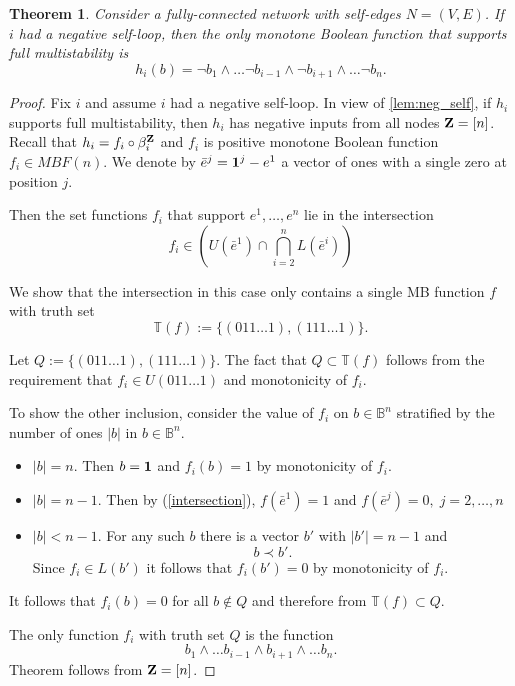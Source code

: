 \documentclass[12pt]{amsart}
\newcommand{\bZ}{{\bf Z}}
\newcommand{\bone}{{\bf 1}}
\newcommand{\bbB}{\mathbb{B}}
\newcommand{\bbT}{\mathbb{T}}
\newtheorem{thm}{Theorem}[section]
\theoremstyle{definition}
\begin{document}
\begin{thm}
Consider a fully-connected network with self-edges $N = (V,E)$. If $i$ had a negative self-loop, then the only monotone Boolean function that supports full multistability is 
\[ h_i(b) = \neg b_1 \wedge \ldots \neg b_{i-1} \wedge \neg b_{i+1} \wedge \ldots \neg b_n.\]
\end{thm}
\begin{proof}
Fix $i$ and assume $i$ had a negative self-loop. In view of \cref{lem:neg_self}, if $h_i$ supports full multistability, then $h_i$ has negative inputs from all nodes $\bZ=[n]$. Recall that 
$h_i=f_i\circ \beta_i^\bZ$ and $f_i$ is positive monotone Boolean function $f_i \in MBF(n)$.
We denote by $\bar{e}^j = \bone^j-e^1$ a vector of ones with a single zero at position $j$.

Then the set functions $f_i$ that support $e^1, \ldots, e^n$ lie in the intersection
\begin{equation} \label{intersection}
    f_i \in \left ( U(\bar{e}^1)\cap \bigcap_{i=2}^n L(\bar{e}^i) \right )
\end{equation}

We show that the intersection in this case only contains a single MB function $f$ with truth set
\[ \bbT(f) :=\{ (011\ldots 1), (111\ldots 1)\}. \]

Let $Q:=\{ (011\ldots 1), (111\ldots 1)\}$. The fact that $Q\subset \bbT(f)$ follows from the requirement that 
$f_i \in U(011\ldots 1)$ and monotonicity of $f_i$.

To show the other inclusion, consider the value of $f_i$ on $b\in \bbB^n$ stratified by the number of ones $|b|$ in $b \in \bbB^n$.

\begin{itemize}
    \item $|b|=n$. Then $b=\bone$ and $f_i(b) = 1$ by monotonicity of $f_i$.
    \item $|b|=n-1$. Then by (\ref{intersection}), $f(\bar{e}^1) = 1$ and $f(\bar{e}^j)=0, \;j=2, \ldots, n$ 
    \item $|b|<n-1$. For any such $b$ there is a vector $b'$ with $|b'|=n-1$ and 
    \[ b\prec b' .\]
    Since $f_i \in L(b')$ it follows that $f_i(b')=0$ by monotonicity of $f_i$.
    \end{itemize}
    It follows that $f_i(b) = 0$ for all $b \not \in Q$ and therefore from $ \bbT(f) \subset Q.$
    
    The only function $f_i$ with truth set $Q$ is the function 
    \[ b_1 \wedge \ldots b_{i-1} \wedge b_{i+1} \wedge \ldots b_n. \]
    Theorem follows from $\bZ=[n]$. 
\end{proof}
\end{document}
